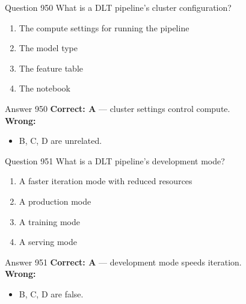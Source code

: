 \documentclass[aspectratio=169,11pt]{beamer}
\begin{document}
	\begin{frame}{Question 950}
		What is a DLT pipeline's cluster configuration?
		\begin{enumerate}[label=\Alph*.]
			\item The compute settings for running the pipeline
			\item The model type
			\item The feature table
			\item The notebook
		\end{enumerate}
	\end{frame}
	\begin{frame}{Answer 950}
		\textbf{Correct: A} --- cluster settings control compute.\\
		\vspace{0.5em}
		\textbf{Wrong:}
		\begin{itemize}
			\item B, C, D are unrelated.
		\end{itemize}
	\end{frame}
	
	\begin{frame}{Question 951}
		What is a DLT pipeline's development mode?
		\begin{enumerate}[label=\Alph*.]
			\item A faster iteration mode with reduced resources
			\item A production mode
			\item A training mode
			\item A serving mode
		\end{enumerate}
	\end{frame}
	\begin{frame}{Answer 951}
		\textbf{Correct: A} --- development mode speeds iteration.\\
		\vspace{0.5em}
		\textbf{Wrong:}
		\begin{itemize}
			\item B, C, D are false.
		\end{itemize}
	\end{frame}
	
\end{document}
